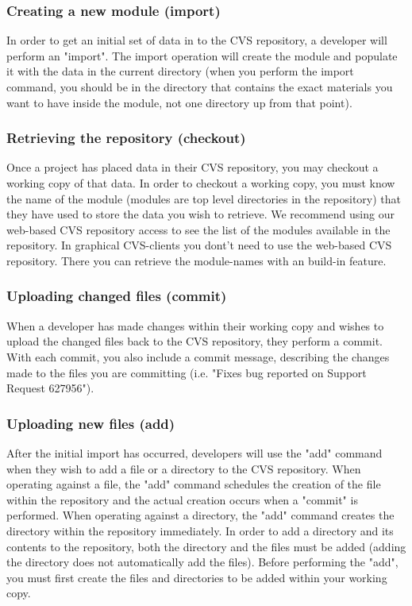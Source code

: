 \subsubsection{Creating a new module (import)}

In order to get an initial set of data in to the CVS repository, a developer will perform an "import". The import operation will create the module and populate it with the data in the current directory (when you perform the import command, you should be in the directory that contains the exact materials you want to have inside the module, not one directory up from that point).

\subsubsection{Retrieving the repository (checkout)}

Once a project has placed data in their CVS repository, you may checkout a working copy of that data. In order to checkout a working copy, you must know the name of the module (modules are top level directories in the repository) that they have used to store the data you wish to retrieve. We recommend using our web-based CVS repository access to see the list of the modules available in the repository. In graphical CVS-clients you dont't need to use the web-based CVS repository. There you can retrieve the module-names with an build-in feature.

\subsubsection{Uploading changed files (commit)}

When a developer has made changes within their working copy and wishes to upload the changed files back to the CVS repository, they perform a commit. With each commit, you also include a commit message, describing the changes made to the files you are committing (i.e. "Fixes bug reported on Support Request 627956").

\subsubsection{Uploading new files (add)}

After the initial import has occurred, developers will use the "add" command when they wish to add a file or a directory to the CVS repository. When operating against a file, the "add" command schedules the creation of the file within the repository and the actual creation occurs when a "commit" is performed. When operating against a directory, the "add" command creates the directory within the repository immediately. In order to add a directory and its contents to the repository, both the directory and the files must be added (adding the directory does not automatically add the files). Before performing the "add", you must first create the files and directories to be added within your working copy.

